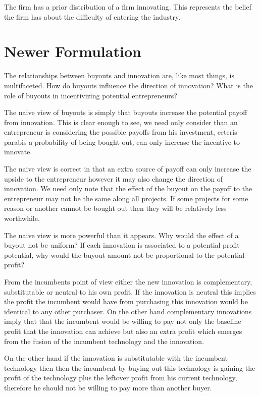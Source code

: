 \documentclass{article}
\begin{document}
The firm has a prior distribution of a firm innovating. This represents the belief the firm has about the difficulty of entering the industry. 


\section{Newer Formulation}
The relationships between buyouts and innovation are, like most things, is multifaceted. How do buyouts influence the direction of innovation? What is the role of buyouts in incentivizing potential entrepreneurs? 

The naive view of buyouts is simply that buyouts increase the potential payoff from innovation. This is clear enough to see, we need only consider than an entrepreneur is considering the possible payoffs from his investment, ceteris parabis a probability of being bought-out, can only increase the incentive to innovate. 

The naive view is correct in that an extra source of payoff can only increase the upside to the entrepreneur however it may also change the direction of innovation. We need only note that the effect of the buyout on the payoff to the entrepreneur may not be the same along all projects. If some projects for some reason or another cannot be bought out then they will be relatively less worthwhile. 

The naive view is more powerful than it appears. Why would the effect of a buyout not be uniform? If each innovation is associated to a potential profit potential, why would the buyout amount not be proportional to the potential profit? 

From the incumbents point of view either the new innovation is complementary, substitutable or neutral to his own profit. If the innovation is neutral this implies the profit the incumbent would have from purchasing this innovation would be identical to any other purchaser. On the other hand complementary innovations imply that that the incumbent would be willing to pay not only the baseline profit that the innovation can achieve but also an extra profit which emerges from the fusion of the incumbent technology and the innovation. 

On the other hand if the innovation is substitutable with the incumbent technology then then the incumbent by buying out this technology is gaining the profit of the technology plus the leftover profit from his current technology, therefore he should not be willing to pay more than another buyer.
\end{document}
